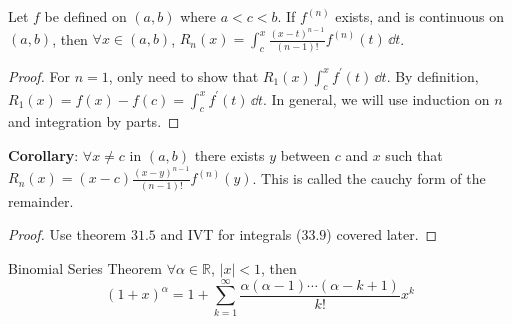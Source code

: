 \documentclass{report}
\begin{document}
\begin{theorem}{31.5}
    Let $f$ be defined on $(a, b)$ where $a < c < b$. If $f^{(n)}$ exists, and is continuous on $(a, b)$, then $\forall x \in (a, b)$, $R_{n}(x) = \int_{c}^{x} \frac{(x - t)^{n - 1}}{(n - 1)!}f^{(n)}(t) \, \dd{t} $.
\end{theorem}
    \begin{proof}
        For $n = 1$, only need to show that $R_{1}(x)  \int_{c}^{x} f^{\prime}(t) \, \dd{t} $. By definition, $R_{1}(x) = f(x)  - f(c) = \int_{c}^{x} f^{\prime}(t) \, \dd{t}$. In general, we will use induction on $n$ and integration by parts.
    \end{proof}

\textbf{Corollary}: $\forall x \neq c$ in $(a, b)$ there exists $y$ between $c$ and $x$ such that $R_{n}(x) = (x - c)\frac{(x - y)^{n - 1}}{(n - 1)!}f^{(n)}(y)$. This is called the cauchy form of the remainder.
    \begin{proof}
        Use theorem $31.5$ and IVT for integrals ($33.9$) covered later.
    \end{proof}

\begin{theorem}{Binomial Series Theorem}
    $\forall \alpha \in \mathbb{R}$, $\lvert x \rvert < 1$, then 
        \begin{equation*}
            (1 + x)^{\alpha} = 1 + \sum_{k = 1}^{\infty} \dfrac{\alpha (\alpha - 1) \cdots (\alpha - k + 1)}{k!} x^{k}
        \end{equation*}
\end{theorem}
\end{document}
